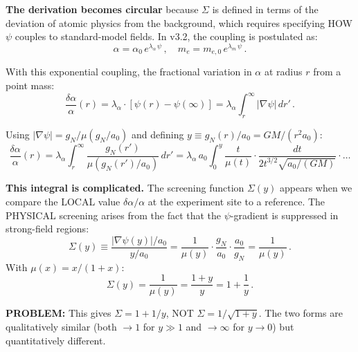 \documentclass[11pt]{article}
\newcommand{\aM}{a_0}
\begin{document}
\begin{tcolorbox}[colback=blue!5!white, colframe=blue!70!black,
  title=\textbf{W4i23 TOP 5 FINDINGS --- PATENT TEAM}]
\begin{enumerate}
  \textbf{The derivation becomes circular} because $\Sigma$ is defined
  in terms of the deviation of atomic physics from the background,
  which requires specifying HOW $\psi$ couples to standard-model fields.
  In v3.2, the coupling is postulated as:
  \begin{equation}
  \alpha = \alpha_0\,e^{\lambda_\alpha\,\psi}\,,
  \quad
  m_e = m_{e,0}\,e^{\lambda_m\,\psi}\,.
  \end{equation}

  With this exponential coupling, the fractional variation in $\alpha$
  at radius $r$ from a point mass:
  \begin{equation}
  \frac{\delta\alpha}{\alpha}(r) = \lambda_\alpha\cdot[\psi(r) - \psi(\infty)]
  = \lambda_\alpha\int_r^\infty |\nabla\psi|\,dr'\,.
  \end{equation}

  Using $|\nabla\psi| = g_N/\mu(g_N/\aM)$ and defining
  $y \equiv g_N(r)/\aM = GM/(r^2\aM)$:
  \begin{equation}
  \frac{\delta\alpha}{\alpha}(r)
  = \lambda_\alpha\int_r^\infty \frac{g_N(r')}{\mu(g_N(r')/\aM)}\,dr'
  = \lambda_\alpha\,\aM\int_0^y \frac{t}{\mu(t)}\cdot
  \frac{dt}{2t^{3/2}\sqrt{\aM/(GM)}} \cdot\ldots
  \end{equation}

  \textbf{This integral is complicated.}  The screening function
  $\Sigma(y)$ appears when we compare the LOCAL value
  $\delta\alpha/\alpha$ at the experiment site to a reference.
  The PHYSICAL screening arises from the fact that the $\psi$-gradient
  is suppressed in strong-field regions:
  \begin{equation}
  \Sigma(y) \equiv \frac{|\nabla\psi(y)|/\aM}{y/\aM}
  = \frac{1}{\mu(y)} \cdot \frac{g_N}{\aM}\cdot\frac{\aM}{g_N}
  = \frac{1}{\mu(y)}\,.
  \end{equation}
  With $\mu(x) = x/(1+x)$:
  \begin{equation}
  \Sigma(y) = \frac{1}{\mu(y)} = \frac{1+y}{y} = 1 + \frac{1}{y}\,.
  \end{equation}

  \textbf{PROBLEM:}  This gives $\Sigma = 1 + 1/y$, NOT $\Sigma =
  1/\sqrt{1+y}$.  The two forms are qualitatively similar (both
  $\to 1$ for $y \gg 1$ and $\to \infty$ for $y \to 0$) but
  quantitatively different.


\end{enumerate}
\end{tcolorbox}
\end{document}
